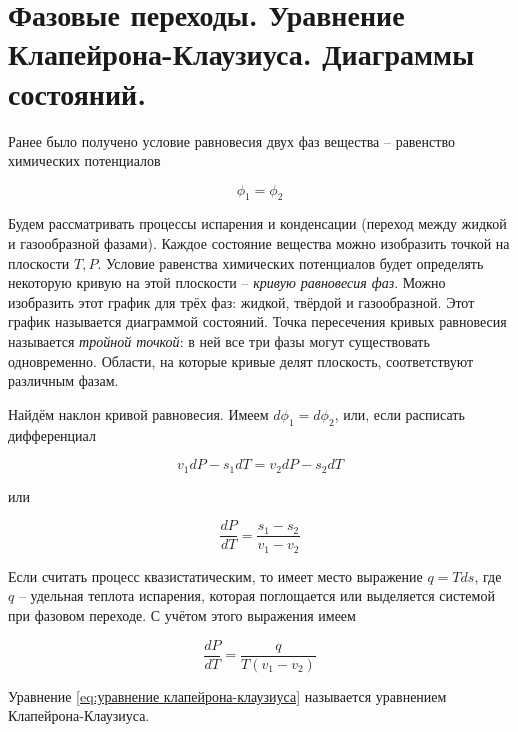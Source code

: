 \section{Фазовые переходы. Уравнение Клапейрона-Клаузиуса. Диаграммы состояний.}

Ранее было получено условие равновесия двух фаз вещества -- равенство химических потенциалов

\begin{equation}
    \phi_1 = \phi_2
\end{equation}

Будем рассматривать процессы испарения и конденсации (переход между жидкой и газообразной фазами). Каждое состояние вещества можно изобразить точкой на плоскости $T, P$. Условие равенства химических потенциалов будет определять некоторую кривую на этой плоскости -- \textit{кривую равновесия фаз}. Можно изобразить этот график для трёх фаз: жидкой, твёрдой и газообразной. Этот график называется диаграммой состояний. Точка пересечения кривых равновесия называется \textit{тройной точкой}: в ней все три фазы могут существовать одновременно. Области, на которые кривые делят плоскость, соответствуют различным фазам.

Найдём наклон кривой равновесия. Имеем $d \phi_1 = d \phi_2$, или, если расписать дифференциал

\begin{equation*}
    v_1 dP - s_1 dT = v_2 dP - s_2 dT
\end{equation*}

\noindent
или

\begin{equation}
    \frac{dP}{dT} = \frac{s_1 - s_2}{v_1 - v_2}
\end{equation}

\noindent
Если считать процесс квазистатическим, то имеет место выражение $q = T ds$, где $q$ -- удельная теплота испарения, которая поглощается или выделяется системой при фазовом переходе. С учётом этого выражения имеем

\begin{equation} \label{eq:уравнение клапейрона-клаузиуса}
    \frac{dP}{dT} = \frac{q}{T \left( v_1 - v_2 \right)}
\end{equation}

\noindent
Уравнение \eqref{eq:уравнение клапейрона-клаузиуса} называется уравнением Клапейрона-Клаузиуса.
